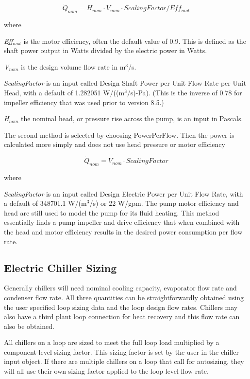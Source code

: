 \begin{equation}
\dot Q_{nom} = H_{nom} \cdot \dot V_{nom} \cdot ScalingFactor /Eff_{mot}
\end{equation}

where

\emph{Eff\(_{mot}\)} is the motor efficiency, often the default value of 0.9. This is defined as the shaft power output in Watts divided by the electric power in Watts.

\emph{V\(_{nom}\)} is the design volume flow rate in m\(^{3}\)/s.

\emph{ScalingFactor} is an input called Design Shaft Power per Unit Flow Rate per Unit Head, with a default of 1.282051 W/((m\(^{3}\)/s)-Pa). (This is the inverse of 0.78 for impeller efficiency that was used prior to version 8.5.)

\emph{H\(_{nom}\)} the nominal head, or pressure rise across the pump, is an input in Pascals.

The second method is selected by choosing PowerPerFlow. Then the power is calculated more simply and does not use head pressure or motor efficiency

\begin{equation}
\dot Q_{nom} = \dot V_{nom} \cdot ScalingFactor
\end{equation}

where

\emph{ScalingFactor} is an input called Design Electric Power per Unit Flow Rate, with a default of 348701.1 W/(m\(^{3}\)/s) or 22 W/gpm. The pump motor efficiency and head are still used to model the pump for its fluid heating. This method essentially finds a pump impeller and drive efficiency that when combined with the head and motor efficiency results in the desired power consumption per flow rate.

\subsection{Electric Chiller Sizing}\label{electric-chiller-sizing}

Generally chillers will need nominal cooling capacity, evaporator flow rate and condenser flow rate. All three quantities can be straightforwardly obtained using the user specified loop sizing data and the loop design flow rates.  Chillers may also have a third plant loop connection for heat recovery and this flow rate can also be obtained.

All chillers on a loop are sized to meet the full loop load multiplied by a component-level sizing factor.  This sizing factor is set by the user in the chiller input object. If there are multiple chillers on a loop that call for autosizing, they will all use their own sizing factor applied to the loop level flow rate.

